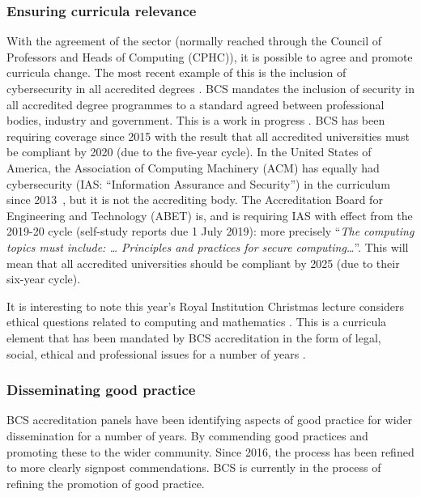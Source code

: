 \documentclass[sigconf]{acmart}
\begin{document}
\subsubsection{Ensuring curricula relevance}
With the agreement of the sector (normally reached through the Council of Professors and Heads of Computing (CPHC)), it is possible to agree and promote curricula change. The most recent example of this is the inclusion of cybersecurity in all accredited degrees \cite{Cricketal2019}. 
BCS mandates the inclusion of security in all accredited degree programmes to a standard agreed between professional bodies, industry and government. This is a work in progress \cite{Irons2016}. BCS has been requiring coverage since 2015 \cite[p.~17--18]{BCS2018a} with the result that all accredited universities must be compliant by 2020 (due to the five-year cycle). In the United States of America, the Association of Computing Machinery (ACM) has equally had cybersecurity (IAS: ``Information Assurance and Security'') in the curriculum since 2013~\cite{ACM2013a}, but it is not the accrediting body. The Accreditation Board for Engineering and Technology (ABET) is, and is requiring IAS with effect from the 2019-20 cycle (self-study reports due 1 July 2019): more precisely \cite[Table 3]{Oudshoornetal2018a} ``{\emph{The computing topics must include: \dots{} Principles and practices for secure computing\dots}}''. This will mean that  all accredited universities should be compliant by 2025 (due to their six-year cycle).

It is interesting to note this year's Royal Institution Christmas lecture considers ethical questions related to computing and mathematics \cite{RoyalInstitution2019}. This is a curricula element that has been mandated by BCS accreditation in the form of legal, social, ethical and professional issues for a number of years \cite{Brooke2018}.

\subsubsection{Disseminating good practice}
BCS accreditation panels have been identifying aspects of good practice for wider dissemination for a number of years. By commending good practices and promoting these to the wider community. Since 2016, the process has been refined to more clearly signpost commendations. BCS is currently in the process of refining the promotion of good practice.
\end{document}

